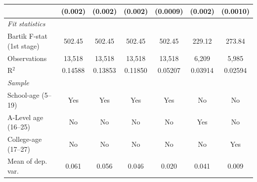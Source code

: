 \begin{tabular}{lcccccc}
                                                                         & (0.002)       & (0.002)                   & (0.002)                     & (0.0009)                              & (0.002)                       & (0.0010)\\   
   \midrule
   \emph{Fit statistics}\\
   Bartik F-stat (1st stage)                                     & 502.45        & 502.45                    & 502.45                      & 502.45                                & 229.12                        & 273.84\\  
   Observations                                                          & 13,518        & 13,518                    & 13,518                      & 13,518                                & 6,209                         & 5,985\\  
   R$^2$                                                                 & 0.14588       & 0.13853                   & 0.11850                     & 0.05207                               & 0.03914                       & 0.02594\\  
\midrule
\emph{Sample}\\
School-age (5--19) & Yes & Yes & Yes & Yes & No & No   \\   
A-Level age (16--25) & No & No & No & No & Yes & No   \\   
College-age (17--27) & No & No & No & No & No & Yes   \\   
   Mean of dep. var.                                                     & 0.061         & 0.056                     & 0.046                       & 0.020                                 & 0.041                         & 0.009\\  
\bottomrule
\end{tabular}
